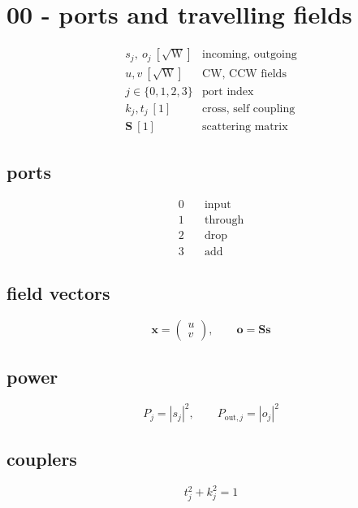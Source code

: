 \section*{00 - ports and travelling fields}

\[
\begin{array}{ll}s_j,\ o_j\ [\sqrt{\mathrm W}]&\text{incoming, outgoing}\\[0.6em]u,v\ [\sqrt{\mathrm W}]&\text{CW, CCW fields}\\[0.6em]j\in\{0,1,2,3\}&\text{port index}\\[0.6em]k_j,t_j\ [1]&\text{cross, self coupling}\\[0.6em]\mathbf S\ [1]&\text{scattering matrix}\end{array}
\]

\subsection*{ports}
\[
\displaystyle \begin{aligned}0&\quad\text{input}\\1&\quad\text{through}\\2&\quad\text{drop}\\3&\quad\text{add}\end{aligned}
\]

\subsection*{field vectors}
\[
\displaystyle \mathbf x=\begin{pmatrix}u\\v\end{pmatrix},\qquad \mathbf o=\mathbf S\mathbf s
\]

\subsection*{power}
\[
\displaystyle P_j=|s_j|^2,\qquad P_{\mathrm{out},j}=|o_j|^2
\]

\subsection*{couplers}
\[
\displaystyle t_j^2+k_j^2=1
\]
